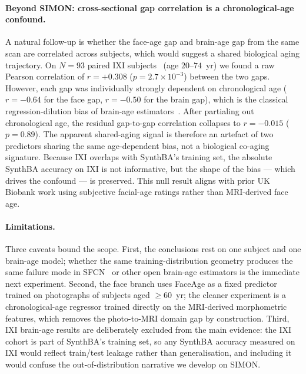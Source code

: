 \documentclass{midl} %
\begin{document}
\paragraph{Beyond SIMON: cross-sectional gap correlation is a chronological-age confound.}
A natural follow-up is whether the face-age gap and brain-age gap from
the same scan are correlated across subjects, which would suggest a shared
biological aging trajectory.  On $N{=}93$ paired IXI subjects~\citep{ixi} (age
$20$--$74$~yr) we found a raw Pearson correlation of $r{=}{+}0.308$
($p{=}2.7{\times}10^{-3}$) between the two gaps.  However, each gap was
individually strongly dependent on chronological age ($r{=}{-}0.64$ for
the face gap, $r{=}{-}0.50$ for the brain gap), which is the classical
regression-dilution bias of brain-age estimators~\citep{smith2019brainage}.
After partialing out chronological age, the residual gap-to-gap
correlation collapses to $r{=}{-}0.015$ ($p{=}0.89$).  The apparent
shared-aging signal is therefore an artefact of two predictors sharing
the same age-dependent bias, not a biological co-aging signature.
Because IXI overlaps with SynthBA's training set, the absolute SynthBA
accuracy on IXI is not informative, but the shape of the bias --- which
drives the confound --- is preserved.  This null result aligns with
prior UK Biobank work using subjective facial-age ratings rather than
MRI-derived face age.

\paragraph{Limitations.}
Three caveats bound the scope.
First, the conclusions rest on one subject and one brain-age model; whether
the same training-distribution geometry produces the same failure mode in
SFCN~\citep{peng2021sfcn} or other open brain-age estimators is the
immediate next experiment.
Second, the face branch uses FaceAge as a fixed predictor trained on
photographs of subjects aged $\geq 60$~yr; the cleaner experiment is a
chronological-age regressor trained directly on the MRI-derived
morphometric features, which removes the photo-to-MRI domain gap by
construction.
Third, IXI brain-age results are deliberately excluded from the main
evidence: the IXI cohort is part of SynthBA's training set, so any
SynthBA accuracy measured on IXI would reflect train/test leakage rather
than generalisation, and including it would confuse the
out-of-distribution narrative we develop on SIMON.



\end{document}
